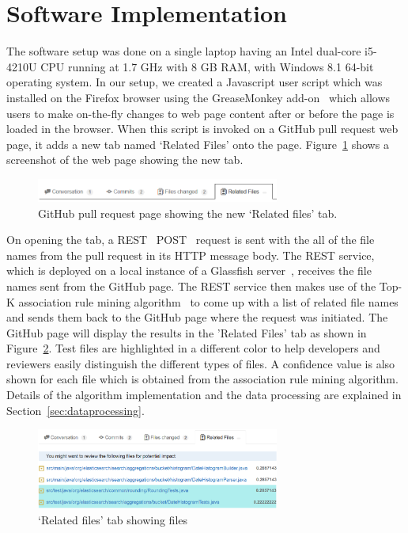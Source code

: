 
\section{Software Implementation}
\label{sec:setup}

The software setup was done on a single laptop having an Intel dual-core i5-4210U CPU running at 1.7 GHz with 8 GB RAM, with Windows 8.1 64-bit operating system. In our setup, we created a Javascript user script which was installed on the Firefox browser using the GreaseMonkey add-on~\cite{greasemonkey1,greasemonkey2} which allows users to make on-the-fly changes to web page content after or before the page is loaded in the browser. When this script is invoked on a GitHub pull request web page, it adds a new tab named `Related Files' onto the page. Figure~\ref{fig:newTabRelated} shows a screenshot of the web page showing the new tab.

\begin{figure}[ht!]
\centering
\includegraphics[width=8cm]{NewTabRelatedFiles}
\caption{GitHub pull request page showing the new `Related files' tab.}
\label{fig:newTabRelated}
\end{figure}

On opening the tab, a REST~\cite{rest} POST~\cite{post_http} request is sent with the all of the file names from the pull request in its HTTP message body. The REST service, which is deployed on a local instance of a Glassfish server~\cite{glassfish}, receives the file names sent from the GitHub page. The REST service then makes use of the Top-K association rule mining algorithm~\cite{fournier2012mining} to come up with a list of related file names and sends them back to the GitHub page where the request was initiated. The GitHub page will display the results in the 'Related Files' tab as shown in Figure~\ref{fig:relatedFilesContents}. Test files are highlighted in a different color to help developers and reviewers easily distinguish the different types of files. A confidence value is also shown for each file which is obtained from the association rule mining algorithm. Details of the algorithm implementation and the data processing are explained in Section~\ref{sec:dataprocessing}.

\begin{figure}[ht!]
\centering
\includegraphics[width=8cm]{RelatedFilesContents}
\caption{`Related files' tab showing files}
\label{fig:relatedFilesContents}
\end{figure}



